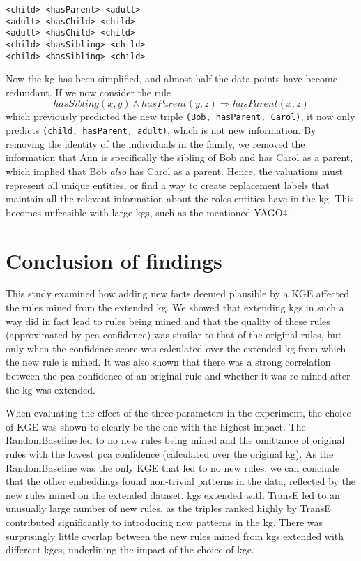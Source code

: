 \setcounter{example}{1}
\begin{example}
\begin{lstlisting}[]
<child> <hasParent> <adult>
<adult> <hasChild> <child>
<adult> <hasChild> <child>
<child> <hasSibling> <child>
<child> <hasSibling> <child>
\end{lstlisting}
\label{mini_simple_KG_rules}
\end{example}

Now the \gls{kg} has been simplified, and almost half the data points have become redundant. If we now consider the rule \[hasSibling(x, y) \wedge hasParent(y,z) \Rightarrow hasParent(x,z)\] which previously predicted the new triple \texttt{(Bob, hasParent, Carol)}, it now only predicts \texttt{(child, hasParent, adult)}, which is not new information. By removing the identity of the individuals in the family, we removed the information that Ann is specifically the sibling of Bob and has Carol as a parent, which implied that Bob \textit{also} has Carol as a parent. Hence, the valuations must represent all unique entities, or find a way to create replacement labels that maintain all the relevant information about the roles entities have in the \gls{kg}. This becomes unfeasible with large \glspl{kg}, such as the mentioned YAGO4.


\section{Conclusion of findings}
This study examined how adding new facts deemed plausible by a KGE affected the rules mined from the extended \gls{kg}. We showed that extending \glspl{kg} in such a way did in fact lead to rules being mined and that the quality of these rules (approximated by \gls{pca} confidence) was similar to that of the original rules, but only when the confidence score was calculated over the extended \gls{kg} from which the new rule is mined. It was also shown that there was a strong correlation between the \gls{pca} confidence of an original rule and whether it was re-mined after the \gls{kg} was extended.

When evaluating the effect of the three parameters in the experiment, the choice of KGE was shown to clearly be the one with the highest impact. The RandomBaseline led to no new rules being mined and the omittance of original rules with the lowest \gls{pca} confidence (calculated over the original \gls{kg}). As the RandomBaseline was the only KGE that led to no new rules, we can conclude that the other embeddings found non-trivial patterns in the data, reflected by the new rules mined on the extended dataset. \glspl{kg} extended with TransE led to an unusually large number of new rules, as the triples ranked highly by TransE contributed significantly to introducing new patterns in the \gls{kg}. There was surprisingly little overlap between the new rules mined from \glspl{kg} extended with different \glspl{kge}, underlining the impact of the choice of \gls{kge}.

